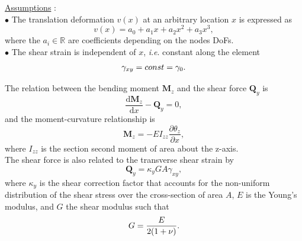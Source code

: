 \documentclass[a4paper,11pt]{article}
\newcommand{\R}{\mathbb{R}}
\newcommand{\bM}{\mathbf{M}}
\newcommand{\bQ}{\mathbf{Q}}
\newcommand{\dif}{\mathrm{d}}
\newcommand{\ie}{\textit{i}.\textit{e}. }
\begin{document}
\noindent \underline{Assumptions} \cite{Nar74}:\\
$\bullet$ The translation deformation $v(x)$ at an arbitrary location $x$ is
expressed as
\begin{equation} \label{eq:v_expr}
	v(x) = a_0 + a_1x + a_2x^2 + a_3x^3,
\end{equation}
where the $a_i \in \R$ are coefficients depending on the nodes DoFs.\\
$\bullet$ The shear strain is independent of $x$, \ie constant along the element
\begin{equation} \label{eq:gamma_0}
	\gamma_{xy} = const = \gamma_0.\\
\end{equation}

\noindent The relation between the bending moment $\bM_z$ and the shear force
$\bQ_y$ is
\begin{equation} \label{eq:relation_M_z_Q_y}
	\frac{\dif \bM_z}{\dif x} - \bQ_y = 0,
\end{equation}
and the moment-curvature relationship is
\begin{equation} \label{eq:M_z}
	\bM_z = -EI_{zz}\frac{\partial \theta_z}{\partial x},
\end{equation}
where $I_{zz}$ is the section second moment of area about the z-axis.\\
The shear force is also related to the transverse shear strain by
\begin{equation}
	\bQ_y = \kappa_yGA\gamma_{xy},
\end{equation}
where $\kappa_y$ is the shear correction factor that accounts for the non-uniform
distribution of the shear stress over the cross-section of area $A$, $E$ is the
Young's modulus, and $G$ the shear modulus such that
\begin{equation}
	G = \frac{E}{2(1+\nu)}.\\
\end{equation}
\end{document}
